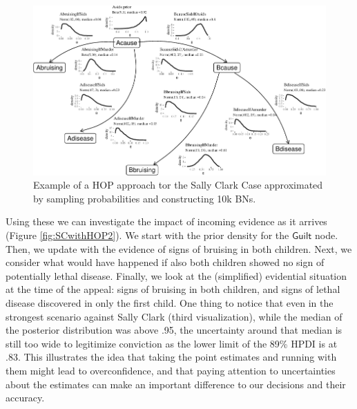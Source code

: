 \documentclass[
  10pt,
  dvipsnames,enabledeprecatedfontcommands]{scrartcl}
\newcommand{\s}[1]{\mbox{$\mathsf{#1}$}}
\begin{document}
\begin{figure}[H]

\begin{center}\includegraphics[width=1.6\linewidth,height=2\textheight,angle=90]{chapter-outline_files/figure-latex/SCwithHOP-1} \end{center}

\caption{Example of a HOP approach tor the Sally Clark Case  approximated by sampling probabilities  and constructing 10k BNs.}
\label{fig:SCwithHOP}
\end{figure}

Using these we can investigate the impact of incoming evidence as it
arrives (Figure \ref{fig:SCwithHOP2}). We start with the prior density
for the \s{Guilt} node. Then, we update with the evidence of signs of
bruising in both children. Next, we consider what would have happened if
also both children showed no sign of potentially lethal disease.
Finally, we look at the (simplified) evidential situation at the time of
the appeal: signs of bruising in both children, and signs of lethal
disease discovered in only the first child. One thing to notice that
even in the strongest scenario against Sally Clark (third
visualization), while the median of the posterior distribution was above
.95, the uncertainty around that median is still too wide to legitimize
conviction as the lower limit of the 89\% HPDI is at .83. This
illustrates the idea that taking the point estimates and running with
them might lead to overconfidence, and that paying attention to
uncertainties about the estimates can make an important difference to
our decisions and their accuracy.
\end{document}
